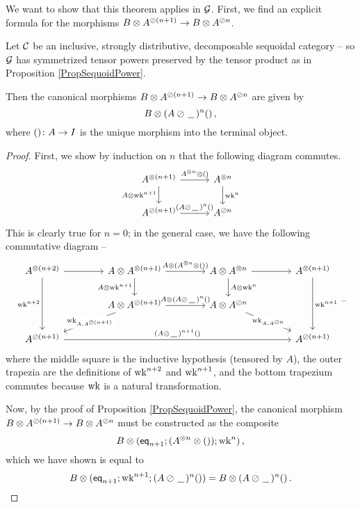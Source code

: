 We want to show that this theorem applies in $\mathcal G$.
First, we find an explicit formula for the morphisms $B \otimes A^{\oslash(n+1)}\to B\otimes A^{\oslash n}$.

\begin{proposition}
  Let ${\mathcal{C}}$ be an inclusive, strongly distributive, decomposable sequoidal category -- so $\mathcal G$ has symmetrized tensor powers preserved by the tensor product as in Proposition \ref{PropSequoidPower}.  

  Then the canonical morphisms $B \otimes A^{\oslash (n+1)}\to B\otimes A^{\oslash n}$ are given by
  \[
    B \otimes (A \oslash \,\underline{\hspace{1.5ex}}\,)^n()\,,
    \]
  where $() \colon A \to I$ is the unique morphism into the terminal object.
\end{proposition}
\begin{proof}
  First, we show by induction on $n$ that the following diagram commutes.
  \[
    \begin{tikzcd}[column sep=30pt]
      A^{\tensor(n+1)} \arrow[r, "A^{\tensor n}\tensor()"] \arrow[d, "A\tensor\wk^{n+1}"']
        & A^{\tensor n} \arrow[d, "\wk^n"] \\
      A^{\sequoid(n+1)} \arrow[r, "(A\sequoid\blank)^n()"]
        & A^{\sequoid n}
    \end{tikzcd}
    \]
  This is clearly true for $n=0$; in the general case, we have the following commutative diagram --
  \[
    \begin{tikzcd}[column sep=41pt]
      A^{\tensor(n+2)} \arrow[r] \arrow[dd, "\wk^{n+2}"']
        & A \tensor A^{\tensor (n+1)} \arrow[r, "A \tensor (A^{\tensor n}\tensor ())"] \arrow[d, "A \tensor \wk^{n+1}"']
          & A \tensor A^{\tensor n} \arrow[r] \arrow[d, "A\tensor \wk^n"]
            & A^{\tensor(n+1)} \arrow[dd, "\wk^{n+1}"] \\
        & A \tensor A^{\sequoid (n+1)} \arrow[r, "A \tensor (A\sequoid\blank)^n()"] \arrow[dl, "{\wk_{A,A^{\sequoid (n+1)}}}" description]
          & A \tensor A^{\sequoid n} \arrow[dr, "{\wk_{A,A^{\sequoid n}}}" description]
            & \\
      A^{\sequoid(n+1)} \arrow[rrr, "(A \sequoid \blank)^{n+1}()"]
        &
          &
            & A^{\sequoid (n+1)}
    \end{tikzcd}\,\text{--}
    \]
  where the middle square is the inductive hypothesis (tensored by $A$), the outer trapezia are the definitions of $\operatorname{wk}^{n+2}$ and $\operatorname{wk}^{n+1}$, and the bottom trapezium commutes because $\operatorname{wk}$ is a natural transformation.

  Now, by the proof of Proposition \ref{PropSequoidPower}, the canonical morphism $B\otimes A^{\oslash (n+1)} \to B\otimes A^{\oslash n}$ must be constructed as the composite
  \[
    B \otimes ({\mathsf{eq}}_{n+1};(A^{\otimes n}\otimes ());\operatorname{wk}^n)\,,
    \]
  which we have shown is equal to
  \[
    B \otimes ({\mathsf{eq}}_{n+1};\operatorname{wk}^{n+1};(A \oslash\,\underline{\hspace{1.5ex}}\,)^n()) = B \otimes (A \oslash\,\underline{\hspace{1.5ex}}\,)^n()\,.\qedhere
    \]
\end{proof}

